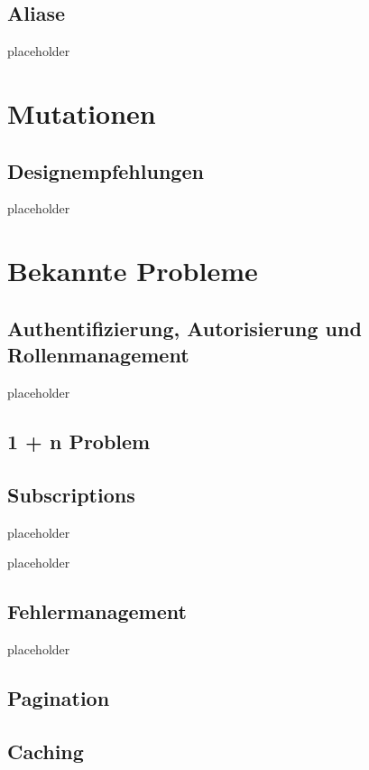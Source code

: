 \documentclass[bachelor, german ]{hgbthesis}
\begin{document}
\subsection{Aliase}

placeholder
\pagebreak

\section{Mutationen}

\subsection{Designempfehlungen}

placeholder
\pagebreak

\section{Bekannte Probleme}

\subsection{Authentifizierung, Autorisierung und Rollenmanagement}

placeholder
\pagebreak

\subsection{1 + n Problem}

\subsection{Subscriptions}

placeholder
\pagebreak

placeholder
\pagebreak

\subsection{Fehlermanagement}

placeholder
\pagebreak

\subsection{Pagination}

\subsection{Caching}
\end{document}
